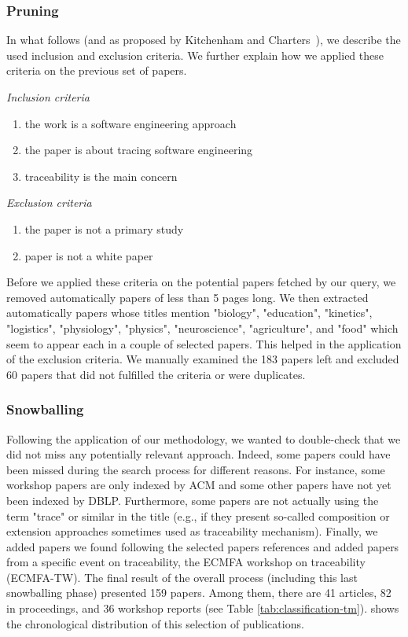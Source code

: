 \subsubsection{Pruning}
In what follows (and as proposed by Kitchenham and Charters~\cite{kitchenham2008}), we describe the used inclusion and exclusion
criteria. We further explain how we applied these criteria on the previous set of papers. 

\textit{Inclusion criteria}
\begin{enumerate}
	\item the work is a software engineering approach
	\item the paper is about tracing software engineering
	\item traceability is the main concern
\end{enumerate}

\textit{Exclusion criteria}
\begin{enumerate}
	\item the paper is not a primary study
	\item paper is not a white paper
\end{enumerate}

Before we applied these criteria on the potential papers fetched by our query, we removed automatically papers of less than 5 pages long.
We then extracted automatically papers whose titles mention "biology", "education", "kinetics", "logistics", "physiology", "physics", "neuroscience", "agriculture", and "food" which seem to appear each in a couple of selected papers. This helped in the application of the exclusion criteria. We manually examined the 183 papers left and excluded 60 papers that did not fulfilled the criteria or were duplicates.

\subsubsection{Snowballing}
Following the application of our methodology, we wanted to double-check that we did not miss any potentially relevant approach. Indeed, some papers could have been missed during the search process for different reasons. For instance, some workshop papers are only indexed by ACM and some other papers have not yet been indexed by DBLP. Furthermore, some papers are not actually using the term "trace" or similar in the title (e.g., if they present so-called composition or extension approaches sometimes used as traceability mechanism). Finally, we added papers we found following the selected papers references and added papers from a specific event on traceability, the ECMFA workshop on traceability (\ie ECMFA-TW). The final result of the overall process (including this last snowballing phase) presented 159 papers. Among them, there are 41 articles, 82 in proceedings, and 36 workshop reports (see Table \ref{tab:classification-tm}).
 shows the chronological distribution of this selection of publications.


